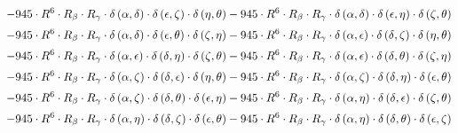 \begin{subequations}
\begin{gather}
 \\[0.2em] \notag 		 - 945 \cdot R^{6} \cdot R_{\beta{}} \cdot R_{\gamma{}} \cdot \delta{}\left(\alpha{}, \delta{}\right) \cdot \delta{}\left(\epsilon{}, \zeta{}\right) \cdot \delta{}\left(\eta{}, \theta{}\right)- 945 \cdot R^{6} \cdot R_{\beta{}} \cdot R_{\gamma{}} \cdot \delta{}\left(\alpha{}, \delta{}\right) \cdot \delta{}\left(\epsilon{}, \eta{}\right) \cdot \delta{}\left(\zeta{}, \theta{}\right) 
 \\[0.2em] \notag 		 - 945 \cdot R^{6} \cdot R_{\beta{}} \cdot R_{\gamma{}} \cdot \delta{}\left(\alpha{}, \delta{}\right) \cdot \delta{}\left(\epsilon{}, \theta{}\right) \cdot \delta{}\left(\zeta{}, \eta{}\right)- 945 \cdot R^{6} \cdot R_{\beta{}} \cdot R_{\gamma{}} \cdot \delta{}\left(\alpha{}, \epsilon{}\right) \cdot \delta{}\left(\delta{}, \zeta{}\right) \cdot \delta{}\left(\eta{}, \theta{}\right) 
 \\[0.2em] \notag 		 - 945 \cdot R^{6} \cdot R_{\beta{}} \cdot R_{\gamma{}} \cdot \delta{}\left(\alpha{}, \epsilon{}\right) \cdot \delta{}\left(\delta{}, \eta{}\right) \cdot \delta{}\left(\zeta{}, \theta{}\right)- 945 \cdot R^{6} \cdot R_{\beta{}} \cdot R_{\gamma{}} \cdot \delta{}\left(\alpha{}, \epsilon{}\right) \cdot \delta{}\left(\delta{}, \theta{}\right) \cdot \delta{}\left(\zeta{}, \eta{}\right) 
 \\[0.2em] \notag 		 - 945 \cdot R^{6} \cdot R_{\beta{}} \cdot R_{\gamma{}} \cdot \delta{}\left(\alpha{}, \zeta{}\right) \cdot \delta{}\left(\delta{}, \epsilon{}\right) \cdot \delta{}\left(\eta{}, \theta{}\right)- 945 \cdot R^{6} \cdot R_{\beta{}} \cdot R_{\gamma{}} \cdot \delta{}\left(\alpha{}, \zeta{}\right) \cdot \delta{}\left(\delta{}, \eta{}\right) \cdot \delta{}\left(\epsilon{}, \theta{}\right) 
 \\[0.2em] \notag 		 - 945 \cdot R^{6} \cdot R_{\beta{}} \cdot R_{\gamma{}} \cdot \delta{}\left(\alpha{}, \zeta{}\right) \cdot \delta{}\left(\delta{}, \theta{}\right) \cdot \delta{}\left(\epsilon{}, \eta{}\right)- 945 \cdot R^{6} \cdot R_{\beta{}} \cdot R_{\gamma{}} \cdot \delta{}\left(\alpha{}, \eta{}\right) \cdot \delta{}\left(\delta{}, \epsilon{}\right) \cdot \delta{}\left(\zeta{}, \theta{}\right) 
 \\[0.2em] \notag 		 - 945 \cdot R^{6} \cdot R_{\beta{}} \cdot R_{\gamma{}} \cdot \delta{}\left(\alpha{}, \eta{}\right) \cdot \delta{}\left(\delta{}, \zeta{}\right) \cdot \delta{}\left(\epsilon{}, \theta{}\right)- 945 \cdot R^{6} \cdot R_{\beta{}} \cdot R_{\gamma{}} \cdot \delta{}\left(\alpha{}, \eta{}\right) \cdot \delta{}\left(\delta{}, \theta{}\right) \cdot \delta{}\left(\epsilon{}, \zeta{}\right) 

\end{gather}
\end{subequations}
